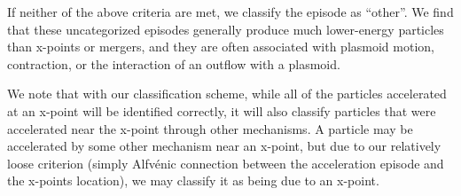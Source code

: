 \documentclass[iop,twocolappendix]{emulateapj}
\begin{document}
If neither of the above criteria are met, we classify the episode as ``other''.  We find that these uncategorized episodes generally produce much lower-energy particles than x-points or mergers, and they are often associated with plasmoid motion, contraction, or the interaction of an outflow with a plasmoid.  

We note that with our classification scheme, while all of the particles accelerated at an x-point will be identified correctly, it will also classify particles that were accelerated near the x-point through other mechanisms.  A particle may be accelerated by some other mechanism near an x-point, but due to our relatively loose criterion (simply Alfv\'enic connection between the acceleration episode and the x-points location), we may classify it as being due to an x-point.  

\end{document}
